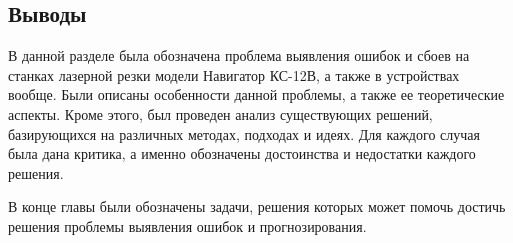 \subsection{Выводы}

В данной разделе была обозначена проблема выявления ошибок и сбоев на станках лазерной резки модели Навигатор КС-12В,
а также в устройствах вообще.
Были описаны особенности данной проблемы, а также ее теоретические аспекты. Кроме этого, был проведен анализ
существующих решений, базирующихся на различных методах, подходах и идеях.
Для каждого случая была дана критика, а именно обозначены достоинства и недостатки каждого решения.

В конце главы были обозначены задачи, решения которых может помочь достичь решения проблемы выявления ошибок и прогнозирования.


\clearpage